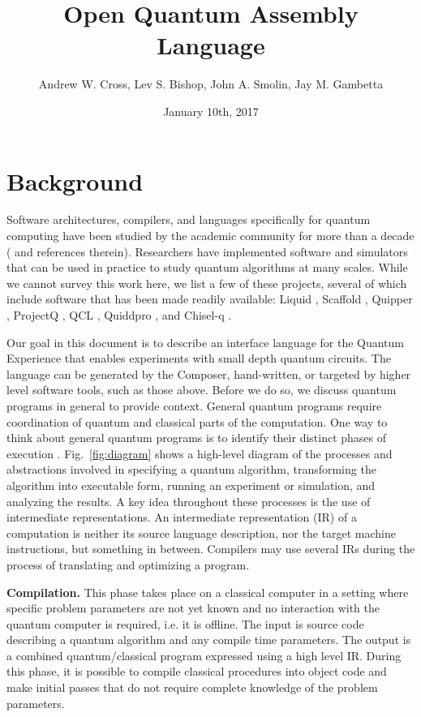 \documentclass[USenglish,12pt,fleqn]{article} %
\begin{document}
\title{Open Quantum Assembly Language}
\author{Andrew W. Cross, Lev S. Bishop, John A. Smolin, Jay M. Gambetta}
\date{January 10th, 2017}

\maketitle

\section{Background}

Software architectures, compilers, and languages specifically for quantum computing have been studied by the academic community for more than a decade (\cite{selinger04,gay06,svore06,haner16} and references therein). Researchers have implemented software and simulators that can be used in practice to study quantum algorithms at many scales. While we cannot survey this work here, we list a few of these projects, several of which include software that has been made readily available: Liquid \cite{ws14,liquid}, Scaffold \cite{scaffold,scaffcc}, Quipper \cite{valiron15,quipper,green13}, ProjectQ \cite{steiger16,projectq}, QCL \cite{omer03,qcl}, Quiddpro \cite{quiddpro,viamontes05}, and Chisel-q \cite{chiselq,chisel}.

Our goal in this document is to describe an interface language for the Quantum Experience that enables experiments with small depth quantum circuits. The language can be generated by the Composer, hand-written, or targeted by higher level software tools, such as those above. Before we do so, we discuss quantum programs in general to provide context. General quantum programs require coordination of quantum and classical parts of the computation. One way to think about general quantum programs is to identify their distinct phases of execution \cite{green13}. Fig.~\ref{fig:diagram} shows a high-level diagram of the processes and abstractions involved in specifying a quantum algorithm, transforming the algorithm into executable form, running an experiment or simulation, and analyzing the results. A key idea throughout these processes is the use of intermediate representations. An intermediate representation (IR) of a computation is neither its source language description, nor the target machine instructions, but something in between. Compilers may use several IRs during the process of translating and optimizing a program.

{\bf Compilation.} This phase takes place on a classical computer in a setting where specific problem parameters are not yet known and no interaction with the quantum computer is required, i.e. it is offline. The input is source code describing a quantum algorithm and any compile time parameters. The output is a combined quantum/classical program expressed using a high level IR. During this phase, it is possible to compile classical procedures into object code and make initial passes that do not require complete knowledge of the problem parameters.
\end{document}
